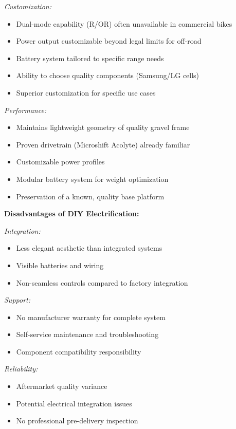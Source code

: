 \documentclass[12pt,a4paper]{article}
\begin{document}
\textit{Customization:}
\begin{itemize}
    \item Dual-mode capability (R/OR) often unavailable in commercial bikes
    \item Power output customizable beyond legal limits for off-road
    \item Battery system tailored to specific range needs
    \item Ability to choose quality components (Samsung/LG cells)
    \item Superior customization for specific use cases
\end{itemize}

\textit{Performance:}
\begin{itemize}
    \item Maintains lightweight geometry of quality gravel frame
    \item Proven drivetrain (Microshift Acolyte) already familiar
    \item Customizable power profiles
    \item Modular battery system for weight optimization
    \item Preservation of a known, quality base platform
\end{itemize}

\textbf{Disadvantages of DIY Electrification:}

\textit{Integration:}
\begin{itemize}
    \item Less elegant aesthetic than integrated systems
    \item Visible batteries and wiring
    \item Non-seamless controls compared to factory integration
\end{itemize}

\textit{Support:}
\begin{itemize}
    \item No manufacturer warranty for complete system
    \item Self-service maintenance and troubleshooting
    \item Component compatibility responsibility
\end{itemize}

\textit{Reliability:}
\begin{itemize}
    \item Aftermarket quality variance
    \item Potential electrical integration issues
    \item No professional pre-delivery inspection
\end{itemize}
\end{document}
